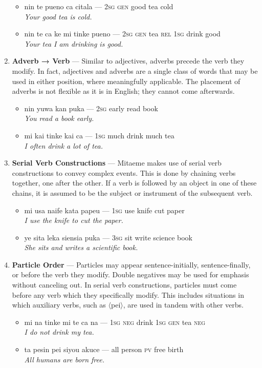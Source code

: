 \documentclass[a4paper]{article}
\begin{document}
\begin{enumerate}
	\begin{itemize}
		\item nin te pueno ca citala — \textsc{2sg} \textsc{gen} good tea cold\\\textit{Your good tea is cold.}
		\item nin te ca ke mi tinke pueno — \textsc{2sg gen} tea \textsc{rel 1sg} drink good\\\textit{Your tea I am drinking is good.}
	\end{itemize}
	\item \textbf{Adverb → Verb} — Similar to adjectives, adverbs precede the verb they modify. In fact, adjectives and adverbs are a single class of words that may be used in either position, where meaningfully applicable. The placement of adverbs is not flexible as it is in English; they cannot come afterwards.
	\begin{itemize}
		\item nin yuwa kan puka — \textsc{2sg} early read book\\\textit{You read a book early.}
		\item mi kai tinke kai ca — \textsc{1sg} much drink much tea\\\textit{I often drink a lot of tea.}
	\end{itemize}
	\item \textbf{Serial Verb Constructions} — Mitaeme makes use of serial verb constructions to convey complex events. This is done by chaining verbs together, one after the other. If a verb is followed by an object in one of these chains, it is assumed to be the subject or instrument of the subsequent verb.
	\begin{itemize}
		\item mi usa naife kata papeu — \textsc{1sg} use knife cut paper\\\textit{I use the knife to cut the paper.}
		\item ye sita leka siensia puka — \textsc{3sg} sit write science book\\\textit{She sits and writes a scientific book.}
	\end{itemize}
	\item \textbf{Particle Order} — Particles may appear sentence-initially, sentence-finally, or before the verb they modify. Double negatives may be used for emphasis without canceling out. In serial verb constructions, particles must come before any verb which they specifically modify. This includes situations in which auxiliary verbs, such as $\langle$pei$\rangle$, are used in tandem with other verbs.
	\begin{itemize}
		\item mi na tinke mi te ca na — \textsc{1sg} \textsc{neg} drink \textsc{1sg} \textsc{gen} tea \textsc{neg}\\\textit{I do not drink my tea.}
		\item ta pesin pei siyou akuce — all person \textsc{pv} free birth\\\textit{All humans are born free.}
	\end{itemize}
\end{enumerate}
\end{document}
